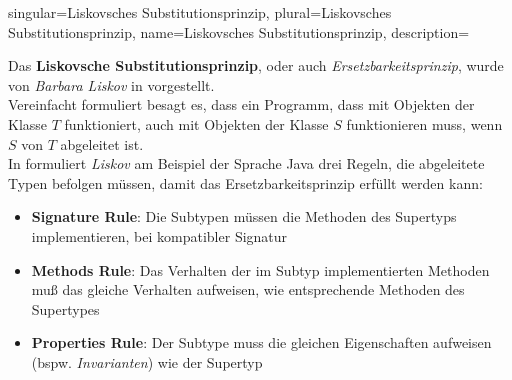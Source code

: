 {
singular={Liskovsches Substitutionsprinzip},
plural={Liskovsches Substitutionsprinzip},
name={Liskovsches Substitutionsprinzip},
description={
Das \textbf{Liskovsche Substitutionsprinzip}, oder auch \textit{Ersetzbarkeitsprinzip}, wurde von \textit{Barbara Liskov} in \cite{Lis87} vorgestellt.\\
Vereinfacht formuliert besagt es, dass ein Programm, dass mit Objekten der Klasse $T$ funktioniert, auch mit Objekten der Klasse $S$ funktionieren muss, wenn $S$ von $T$ abgeleitet ist.\\
In \cite[174 ff.]{LG00} formuliert \textit{Liskov} am Beispiel der Sprache Java drei Regeln, die abgeleitete Typen befolgen müssen, damit das Ersetzbarkeitsprinzip erfüllt werden kann:
\begin{itemize}
\item \textbf{Signature Rule}: Die Subtypen müssen die Methoden des Supertyps implementieren, bei kompatibler Signatur
\item \textbf{Methods Rule}: Das Verhalten der im Subtyp implementierten Methoden muß das gleiche Verhalten aufweisen, wie entsprechende Methoden des Supertypes
\item \textbf{Properties Rule}: Der Subtype muss die gleichen Eigenschaften aufweisen (bspw. \textit{Invarianten}) wie der Supertyp
\end{itemize}
}
}

